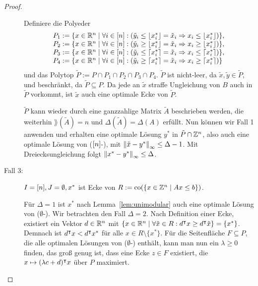\begin{proof}
\begin{description}
		Definiere die Polyeder
		$$
		\begin{array}{l}
		P_1:= \{ x\in\mathbb{R}^n \mid \forall i\in[n]: (\tilde{y}_i\leq \left\lfloor x^*_i \right\rfloor = \tilde{x}_i \Rightarrow x_i \leq \left\lfloor x^*_i \right\rfloor)\},\\
		P_2:= \{ x\in\mathbb{R}^n \mid \forall i\in[n]: (\tilde{y}_i\geq \left\lfloor x^*_i \right\rfloor = \tilde{x}_i \Rightarrow x_i \geq \left\lfloor x^*_i \right\rfloor)\}, \\
		P_3:= \{ x\in\mathbb{R}^n \mid \forall i\in[n]: (\tilde{y}_i\leq \left\lceil x^*_i \right\rceil = \tilde{x}_i \Rightarrow x_i \leq \left\lceil x^*_i \right\rceil)\},\\
		P_4:= \{ x\in\mathbb{R}^n \mid \forall i\in[n]: (\tilde{y}_i\geq \left\lceil x^*_i \right\rceil = \tilde{x}_i \Rightarrow x_i \geq \left\lceil x^*_i \right\rceil)\}
		\end{array}
		$$
		und das Polytop $\tilde{P}:=P\cap P_1 \cap P_2 \cap P_3 \cap P_4$.
		$\tilde{P}$ ist nicht-leer, da $\tilde{x}, \tilde{y}\in\tilde{P}$, und beschränkt, da $\tilde{P}\subseteq P$.
		Da jede an $\tilde{x}$ straffe Ungleichung von $B$ auch in $\tilde{P}$ vorkommt, ist $\tilde{x}$ auch eine optimale Ecke von $\tilde{P}$.
		
		$\tilde{P}$ kann wieder durch eine ganzzahlige Matrix $\tilde{A}$ beschrieben werden, die weiterhin $\rang(\tilde{A})=n$ und $\Delta(\tilde{A})=\Delta(A)$  erfüllt.
		Nun können wir Fall 1 anwenden und erhalten eine optimale Lösung $y^*$ in $\tilde{P}\cap\mathbb{Z}^n$, also auch eine optimale Lösung von ($[n]$-\MIPI), mit $\left\lVert\tilde{x} -y^*\right\rVert_\infty\leq \Delta -1$.
		Mit Dreiecksungleichung folgt $\left\lVert x^* - y^*\right\rVert_\infty\leq \Delta$.
		
		\item[Fall 3:] $I=[n],J=\emptyset,x^*$ ist Ecke von $R:=\operatorname{co}(\{ x\in\mathbb{Z}^n \mid Ax\leq b \})$.
		
		Für $\Delta=1$ ist $x^*$ nach Lemma~\ref{lem:unimodular} auch eine optimale Lösung von ($\emptyset$-\MIPI).
		Wir betrachten den Fall $\Delta=2$.
		Nach Definition einer Ecke, existiert ein Vektor $d\in\mathbb{R}^n$ mit $\{ x\in\mathbb{R}^n \mid \forall \tilde{x}\in R: d^\intercal x \geq d^\intercal\tilde{x} \}=\{x^*\}$.
		Demnach ist $d^\intercal x < d^\intercal x^*$ für alle $x\in R\setminus\{x^*\}$.
		Für die Seitenfläche $F\subseteq P$, die alle optimalen Lösungen von ($\emptyset$-\MIPI) enthält, kann man nun ein $\lambda\geq0$ finden, das groß genug ist, dass eine Ecke $z\in F$ existiert, die $x\mapsto (\lambda c+d)^\intercal x$ über $P$ maximiert. 
		

\end{description}
\end{proof}
